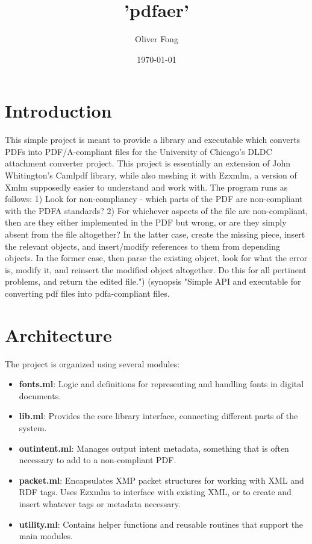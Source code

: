 \documentclass[11pt]{article}
\title{'pdfaer'}
\author{Oliver Fong}
\date{\today}
\begin{document}
\maketitle

\section*{Introduction}
This simple project is meant to provide a library and executable which converts PDFs
into PDF/A-compliant files for the University of Chicago's DLDC attachment converter project.
This project is essentially an extension of John Whitington's Camlpdf library, while also
meshing it with Ezxmlm, a version of Xmlm supposedly easier to understand and work with.
The program runs as follows: 1) Look for non-compliancy - which parts of the PDF are non-compliant
with the PDFA standards? 2) For whichever aspects of the file are non-compliant, then are they
either implemented in the PDF but wrong, or are they simply absent from the file altogether? In 
the latter case, create the missing piece, insert the relevant objects, and insert/modify references to them from
depending objects. In the former case, then parse the existing object, look for what the error is, modify it, and
reinsert the modified object altogether. Do this for all pertinent problems, and return the edited file.")
 (synopsis "Simple API and executable for converting pdf files into pdfa-compliant files.

\section*{Architecture}
The project is organized using several modules:
\begin{itemize}
  \item \textbf{fonts.ml}: Logic and definitions for representing and handling fonts in digital documents.
  \item \textbf{lib.ml}: Provides the core library interface, connecting different parts of the system.
  \item \textbf{outintent.ml}: Manages output intent metadata, something that is often necessary to add to a non-compliant PDF.
  \item \textbf{packet.ml}: Encapsulates XMP packet structures for working with XML and RDF tags. Uses Ezxmlm to interface with existing XML, or to create and insert whatever tags or metadata necessary.
  \item \textbf{utility.ml}: Contains helper functions and reusable routines that support the main modules.
\end{itemize}
\end{document}
